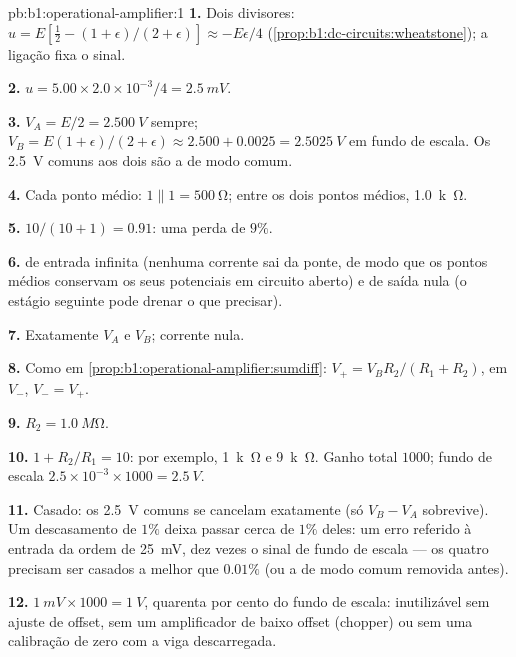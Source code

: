 \begin{solution}{pb:b1:operational-amplifier:1}
\textbf{1.} Dois divisores: $u = E[\tfrac12 - (1 + \epsilon)/(2 + \epsilon)]
\approx -E\epsilon/4$ (\cref{prop:b1:dc-circuits:wheatstone}); a ligação
fixa o sinal.

\textbf{2.} $u = 5.00 \times 2.0\times10^{-3}/4 = \qty{2.5}{mV}$.

\textbf{3.} $V_A = E/2 = \qty{2.500}{V}$ sempre; $V_B = E(1 + \epsilon)/(2 +
\epsilon) \approx 2.500 + 0.0025 = \qty{2.5025}{V}$ em fundo de escala. Os
\qty{2.5}{V} comuns aos dois são a  de modo comum.

\textbf{4.} Cada ponto médio: $1 \parallel 1 = \qty{500}{\ohm}$; entre os
dois pontos médios, \qty{1.0}{k\ohm}.

\textbf{5.} $10/(10 + 1) = 0.91$: uma perda de $9\%$.

\textbf{6.}  de entrada infinita (nenhuma corrente sai da ponte, de modo que
os pontos médios conservam os seus potenciais em circuito aberto) e  de
saída nula (o estágio seguinte pode drenar o que precisar).

\textbf{7.} Exatamente $V_A$ e $V_B$; corrente nula.

\textbf{8.} Como em \cref{prop:b1:operational-amplifier:sumdiff}: $V_+ =
V_BR_2/(R_1 + R_2)$,  em $V_-$, $V_- = V_+$.

\textbf{9.} $R_2 = \qty{1.0}{M\ohm}$.

\textbf{10.} $1 + R_2/R_1 = 10$: por exemplo, \qty{1}{k\ohm} e \qty{9}{k\ohm}.
Ganho total $1000$; fundo de escala $2.5 \times 10^{-3} \times 1000 = \qty{2.5}{V}$.

\textbf{11.} Casado: os \qty{2.5}{V} comuns se cancelam exatamente (só
$V_B - V_A$ sobrevive). Um descasamento de $1\%$ deixa passar cerca de $1\%$ deles: um
erro referido à entrada da ordem de \qty{25}{mV}, dez vezes o sinal de
fundo de escala --- os quatro  precisam ser casados a melhor que $0.01\%$
(ou a  de modo comum removida antes).

\textbf{12.} $1\ \unit{mV} \times 1000 = \qty{1}{V}$, quarenta por cento do fundo
de escala: inutilizável sem ajuste de offset, sem um amplificador de baixo offset
(chopper) ou sem uma calibração de zero com a viga descarregada.


\end{solution}
